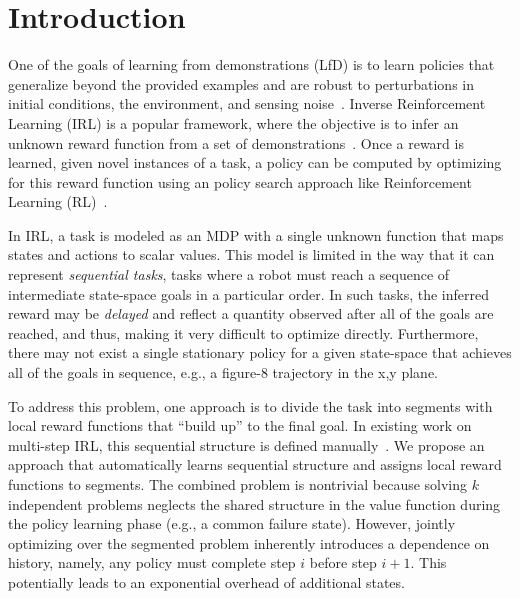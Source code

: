 \section{Introduction}
One of the goals of learning from demonstrations (LfD) is to learn policies that generalize beyond the provided examples and are robust to perturbations in initial conditions, the environment, and sensing noise~\cite{argall2009survey}.
Inverse Reinforcement Learning (IRL) is a popular framework, where the objective is to infer an unknown reward function from a set of demonstrations~\cite{DBLP:conf/nips/KolterAN07, coates2008learning, abbeel2004apprenticeship}.
Once a reward is learned, given novel instances of a task, a policy can be computed by optimizing for this reward function using an policy search approach like Reinforcement Learning (RL)~\cite{ng2000algorithms, abbeel2004apprenticeship}.

In IRL, a task is modeled as an MDP with a single unknown function that maps states and actions to scalar values. 
This model is limited in the way that it can represent \emph{sequential tasks}, tasks where a robot must reach a sequence of intermediate state-space goals in a particular order.
In such tasks, the inferred reward may be \emph{delayed}
and reflect a quantity observed after all of the goals are reached, and thus, making it very difficult to optimize directly. 
Furthermore, there may not exist a single stationary policy for a given state-space that achieves all of the goals in sequence, e.g., a figure-8 trajectory in the x,y plane.

To address this problem, one approach is to divide the task into segments with local reward functions that ``build up'' to the final goal.
In existing work on multi-step IRL, this sequential structure is defined manually~\cite{DBLP:conf/nips/KolterAN07}.
We propose an approach that automatically learns sequential structure and assigns local reward functions to segments.
The combined problem is nontrivial because solving $k$ independent problems neglects the shared structure in the value function during the policy learning phase (e.g., a common failure state).
However, jointly optimizing over the segmented problem inherently introduces a dependence on history, namely, any policy must complete step $i$ before step $i+1$.
This potentially leads to an exponential overhead of additional states. 

